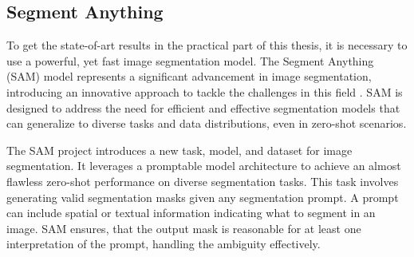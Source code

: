 


  \subsection{Segment Anything}
To get the state-of-art results in the practical part of this thesis, it is necessary to use a powerful, yet fast
image
segmentation model. The Segment Anything (SAM) model represents a significant advancement in image segmentation,
introducing an innovative approach to tackle the challenges in this field \cite{SAM2023}. SAM is designed to address
the need
for
efficient and effective segmentation models that can generalize to diverse tasks and data distributions, even in zero-shot scenarios.

The SAM project introduces a new task, model, and dataset for image segmentation. It leverages a promptable model
architecture to achieve an almost flawless zero-shot performance on diverse segmentation tasks. This task involves
generating valid segmentation masks given any segmentation prompt. A prompt can include spatial or textual
information indicating what to segment in an image. SAM ensures, that the output mask is reasonable for at least one
interpretation of the prompt, handling the ambiguity effectively.

